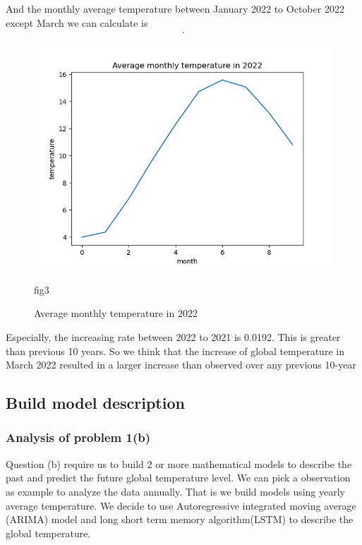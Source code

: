 \documentclass{apmcmthesis}
\begin{document}
  And the monthly average temperature between January 2022 to October 2022 except March we can calculate is 
  \begin{align*}
    [3.989,  4.358, 6.812,9.665, 12.313, 14.742, 15.588, 15.07 ,13.151, 10.811].
  \end{align*}
  \begin{figure}[htbp]
    \centering
    \includegraphics[scale=0.35]{Average monthly temperature in 2022.jpg}
    \caption{Average monthly temperature in 2022}{fig3}
  \end{figure}
  
  Especially, the increasing rate between 2022 to 2021 is 0.0192.
  This is greater than previous 10 years.
  So we think that the increase of global temperature in March 2022 resulted in a larger increase than observed over any previous 10-year 
  
  
  \subsection{Build model description}
  \subsubsection{Analysis of problem 1(b)}
  Question (b) require us to build 2 or more mathematical models to describe the past and predict the future global temperature level.
  We can pick a observation as example to analyze the data annually. 
  That is we build models using yearly average temperature. 
  We decide to use Autoregressive integrated moving average (ARIMA) model and long short term memory algorithm(LSTM) to describe the global temperature.
  
\end{document}

